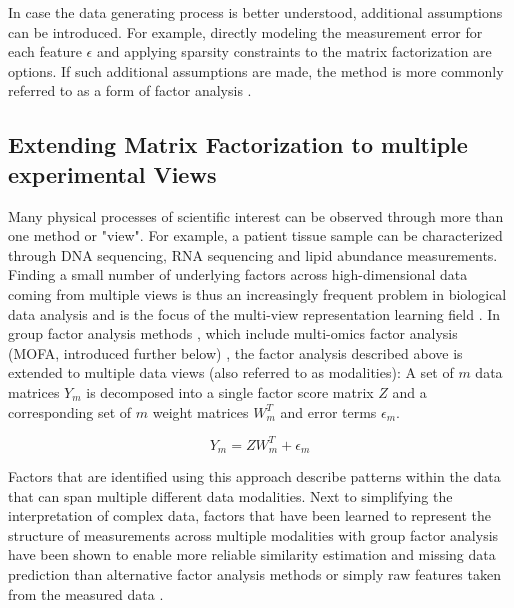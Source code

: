 \begin{flushleft}
In case the data generating process is better understood, additional assumptions can be introduced. For example, directly modeling the measurement error for each feature \(\epsilon\) and applying sparsity constraints to the matrix factorization are options. If such additional assumptions are made, the method is more commonly referred to as a form of factor analysis \parencite{klamiGroupFactorAnalysis2014}.


\subsection{Extending Matrix Factorization to multiple experimental Views}

Many physical processes of scientific interest can be observed through more than one method or "view". For example, a patient tissue sample can be characterized through DNA sequencing, RNA sequencing and lipid abundance measurements. Finding a small number of underlying factors across high-dimensional data coming from multiple views is thus an increasingly frequent problem in biological data analysis and is the focus of the multi-view representation learning field \parencite{liSurveyMultiViewRepresentation2019}. In group factor analysis methods \parencite{virtanenBayesianGroupFactor2012, klamiGroupFactorAnalysis2014}, which include multi-omics factor analysis (MOFA, introduced further below) \parencite{argelaguetMultiOmicsFactorAnalysis2018b, argelaguetMOFAStatisticalFramework2020a}, the factor analysis described above is extended to multiple data views (also referred to as modalities): A set of \(m\) data matrices \( Y_m \) is decomposed into a single factor score matrix \( Z \) and a corresponding set of \(m\) weight matrices \( W_m^T \) and error terms \(\epsilon_m\). 

\begin{equation}
    Y_m = ZW_m^T + \epsilon_m
\end{equation}

Factors that are identified using this approach describe patterns within the data that can span multiple different data modalities. Next to simplifying the interpretation of complex data, factors that have been learned to represent the structure of measurements across multiple modalities with group factor analysis have been shown to enable more reliable similarity estimation and missing data prediction than alternative factor analysis methods or simply raw features taken from the measured data \parencite{klamiGroupFactorAnalysis2014}.
\par


\end{flushleft}
